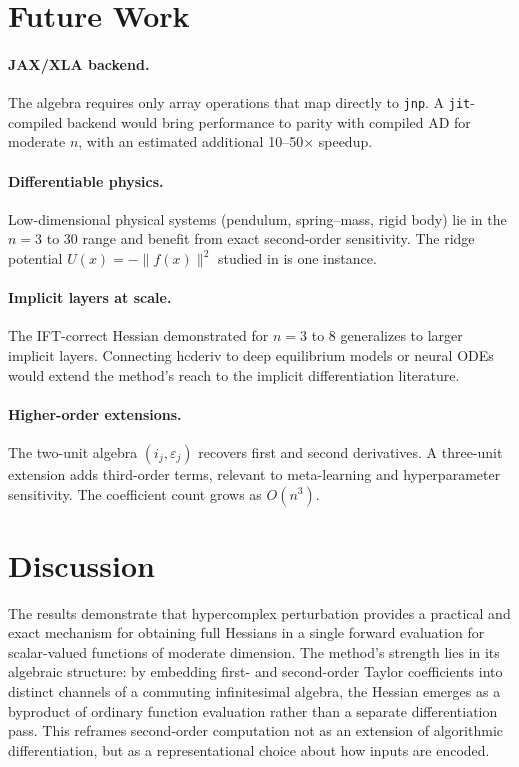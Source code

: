 \documentclass[11pt]{article}
\begin{document}
\section{Future Work}

\paragraph{JAX/XLA backend.}
The algebra requires only array operations that map directly to \texttt{jnp}.
A \texttt{jit}-compiled backend would bring performance to parity with compiled AD
for moderate $n$, with an estimated additional 10--50$\times$ speedup.

\paragraph{Differentiable physics.}
Low-dimensional physical systems (pendulum, spring--mass, rigid body) lie in the
$n = 3$ to $30$ range and benefit from exact second-order sensitivity. The ridge
potential $U(x) = -\|f(x)\|^2$ studied in \citet{byte2026b} is one instance.

\paragraph{Implicit layers at scale.}
The IFT-correct Hessian demonstrated for $n = 3$ to $8$ generalizes to larger
implicit layers. Connecting hcderiv to deep equilibrium models \citep{bai2019}
or neural ODEs \citep{chen2018} would extend the method's reach to the implicit
differentiation literature.

\paragraph{Higher-order extensions.}
The two-unit algebra $(i_j, \varepsilon_j)$ recovers first and second derivatives.
A three-unit extension adds third-order terms, relevant to meta-learning and
hyperparameter sensitivity. The coefficient count grows as $O(n^3)$.

\section{Discussion}

The results demonstrate that hypercomplex perturbation provides a practical and exact
mechanism for obtaining full Hessians in a single forward evaluation for scalar-valued
functions of moderate dimension. The method's strength lies in its algebraic
structure: by embedding first- and second-order Taylor coefficients into distinct
channels of a commuting infinitesimal algebra, the Hessian emerges as a byproduct of
ordinary function evaluation rather than a separate differentiation pass. This
reframes second-order computation not as an extension of algorithmic differentiation,
but as a representational choice about how inputs are encoded.
\end{document}
